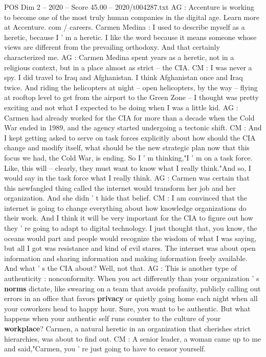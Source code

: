 \begin{textsample}{POS Dim 2 – 2020 – Score 45.00 – 2020/t004287.txt}
AG : Accenture is working to become one of the most truly human companies in the digital age.
Learn more at Accenture. com / careers.
Carmen Medina : I used to describe myself as a heretic, because I ' m a heretic.
I like the word because it means someone whose views are different from the prevailing orthodoxy.
And that certainly characterized me.
AG : Carmen Medina spent years as a heretic, not in a religious context, but in a place almost as strict -- the CIA.
CM : I was never a spy.
I did travel to Iraq and Afghanistan.
I think Afghanistan once and Iraq twice.
And riding the helicopters at night -- open helicopters, by the way -- flying at rooftop level to get from the airport to the Green Zone -- I thought was pretty exciting and not what I expected to be doing when I was a little kid.
AG : Carmen had already worked for the CIA for more than a decade when the Cold War ended in 1989, and the agency started undergoing a tectonic shift.
CM : And I kept getting asked to serve on task forces explicitly about how should the CIA change and modify itself, what should be the new strategic plan now that this focus we had, the Cold War, is ending.
So I ' m thinking,"I ' m on a task force.
Like, this will -- clearly, they must want to know what I really think."And so, I would say in the task force what I really think.
AG : Carmen was certain that this newfangled thing called the internet would transform her job and her organization.
And she didn ' t hide that belief.
CM : I am convinced that the internet is going to change everything about how knowledge organizations do their work.
And I think it will be very important for the CIA to figure out how they ' re going to adapt to digital technology.
I just thought that, you know, the oceans would part and people would recognize the wisdom of what I was saying, but all I got was resistance and kind of evil stares.
The internet was about open information and sharing information and making information freely available.
And what ' s the CIA about?
Well, not that.
AG : This is another type of authenticity : nonconformity.
When you act differently than your organization ' s \textbf{norms} dictate, like swearing on a team that avoids profanity, publicly calling out errors in an office that favors \textbf{privacy} or quietly going home each night when all your coworkers head to happy hour.
Sure, you want to be authentic.
But what happens when your authentic self runs counter to the culture of your \textbf{workplace}?
Carmen, a natural heretic in an organization that cherishes strict hierarchies, was about to find out.
CM : A senior leader, a woman came up to me and said,"Carmen, you ' re just going to have to censor yourself.

\end{textsample}
